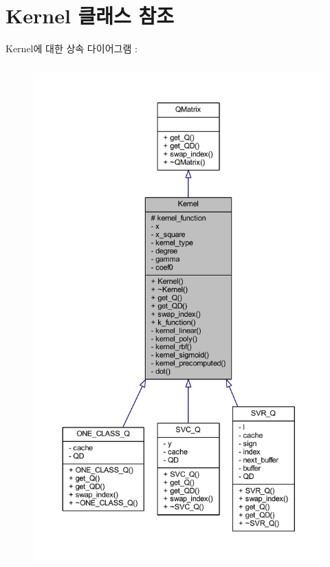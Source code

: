 \hypertarget{class_kernel}{\section{Kernel 클래스 참조}
\label{class_kernel}
}


Kernel에 대한 상속 다이어그램 \+: 
\nopagebreak
\begin{figure}[H]
\begin{center}
\leavevmode
\includegraphics[height=550pt]{class_kernel__inherit__graph}
\end{center}
\end{figure}


